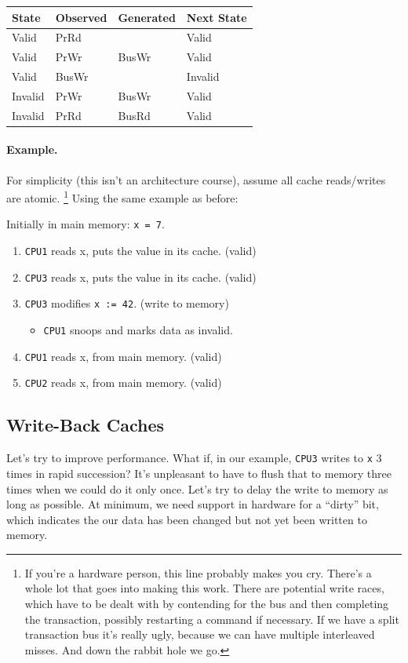   \begin{center}
    \begin{tabular}{l|l|l|l}
      {\bf State} & {\bf Observed} & {\bf Generated} & {\bf Next State}\\ \hline
      Valid   & PrRd  &       & Valid\\
      Valid   & PrWr  & BusWr & Valid\\
      Valid   & BusWr &       & Invalid\\
      Invalid & PrWr  & BusWr & Valid\\
      Invalid & PrRd  & BusRd & Valid\\
    \end{tabular}
  \end{center}

\paragraph{Example.} For simplicity (this isn't an architecture course), assume all cache
      reads/writes are atomic. \footnote{If you're a hardware person, this line probably makes you cry. There's a whole lot that goes into making this work. There are potential write races, which have to be dealt with by contending for the bus and then completing the transaction, possibly restarting a command if necessary. If we have a split transaction bus it's really ugly, because we can have multiple interleaved misses. And down the rabbit hole we go.} Using the same example as before:

Initially in main memory: {\tt x = 7}.

  \begin{enumerate}
    \item {\tt CPU1} reads x, puts the value in its cache. {(valid)}
    \item {\tt CPU3} reads x, puts the value in its cache. {(valid)}
    \item {\tt CPU3} modifies {\tt x := 42}. {(write to memory)}
      \begin{itemize}
        \item {{\tt CPU1} snoops and marks data as invalid.}
      \end{itemize}
    \item {\tt CPU1} reads x, {from main memory. (valid)}
    \item {\tt CPU2} reads x, {from main memory. (valid)}
  \end{enumerate}

\subsection*{Write-Back Caches}
Let's try to improve performance. What if, in our example, {\tt CPU3} writes to {\tt x} 3 times in rapid succession? It's unpleasant to have to flush that to memory three times when we could do it only once. Let's try to delay the write to memory as long as possible. At minimum, we need support in hardware for a ``dirty'' bit, which indicates the our data has been changed but not yet been written to memory.

